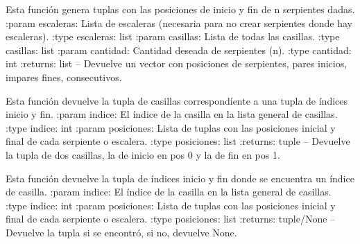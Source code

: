 \documentclass[letterpaper,10pt,english]{sphinxmanual}
\begin{document}
\begin{fulllineitems}
\begin{fulllineitems}
\end{fulllineitems}


\begin{fulllineitems}
\label{\detokenize{codigo:tablero.TableroSE.generar_serpientes}}
Esta función genera tuplas con las posiciones de inicio y fin de n serpientes dadas.
:param escaleras: Lista de escaleras (necesaria para no crear serpientes donde hay escaleras).
:type escaleras: list
:param casillas: Lista de todas las casillas.
:type casillas: list
:param cantidad: Cantidad deseada de serpientes (n).
:type cantidad: int
:returns:  list -- Devuelve un vector con posiciones de serpientes, pares inicios, impares fines, consecutivos.

\end{fulllineitems}


\begin{fulllineitems}
\label{\detokenize{codigo:tablero.TableroSE.getPar}}
Esta función devuelve la tupla de casillas correspondiente a una tupla de índices inicio y fin.
:param indice: El índice de la casilla en la lista general de casillas.
:type indice: int
:param posiciones: Lista de tuplas con las posiciones inicial y final de cada serpiente o escalera.
:type posiciones: list
:returns:  tuple -- Devuelve la tupla de dos casillas, la de inicio en pos 0 y la de fin en pos 1.

\end{fulllineitems}


\begin{fulllineitems}
\label{\detokenize{codigo:tablero.TableroSE.getPosicionesEnTupla}}
Esta función devuelve la tupla de índices inicio y fin donde se encuentra un índice de casilla.
:param indice: El índice de la casilla en la lista general de casillas.
:type indice: int
:param posiciones: Lista de tuplas con las posiciones inicial y final de cada serpiente o escalera.
:type posiciones: list
:returns:  tuple/None -- Devuelve la tupla si se encontró, si no, devuelve None.


\end{fulllineitems}
\end{fulllineitems}
\end{document}
